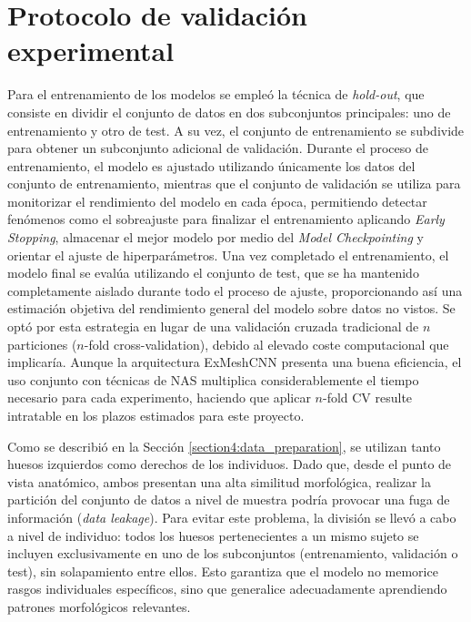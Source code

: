 \section{Protocolo de validación experimental}
Para el entrenamiento de los modelos se empleó la técnica de \textit{hold-out}, que consiste en dividir el conjunto de datos en dos subconjuntos principales: uno de entrenamiento y otro de test. A su vez, el conjunto de entrenamiento se subdivide para obtener un subconjunto adicional de validación. Durante el proceso de entrenamiento, el modelo es ajustado utilizando únicamente los datos del conjunto de entrenamiento, mientras que el conjunto de validación se utiliza para monitorizar el rendimiento del modelo en cada época, permitiendo detectar fenómenos como el sobreajuste para finalizar el entrenamiento aplicando \textit{Early Stopping}, almacenar el mejor modelo por medio del \textit{Model Checkpointing} y orientar el ajuste de hiperparámetros. Una vez completado el entrenamiento, el modelo final se evalúa utilizando el conjunto de test, que se ha mantenido completamente aislado durante todo el proceso de ajuste, proporcionando así una estimación objetiva del rendimiento general del modelo sobre datos no vistos. Se optó por esta estrategia en lugar de una validación cruzada tradicional de $n$ particiones ($n$-fold cross-validation), debido al elevado coste computacional que implicaría. Aunque la arquitectura ExMeshCNN presenta una buena eficiencia, el uso conjunto con técnicas de NAS multiplica considerablemente el tiempo necesario para cada experimento, haciendo que aplicar $n$-fold CV resulte intratable en los plazos estimados para este proyecto.

Como se describió en la Sección \ref{section4:data_preparation}, se utilizan tanto huesos izquierdos como derechos de los individuos. Dado que, desde el punto de vista anatómico, ambos presentan una alta similitud morfológica, realizar la partición del conjunto de datos a nivel de muestra podría provocar una fuga de información (\textit{data leakage}). Para evitar este problema, la división se llevó a cabo a nivel de individuo: todos los huesos pertenecientes a un mismo sujeto se incluyen exclusivamente en uno de los subconjuntos (entrenamiento, validación o test), sin solapamiento entre ellos. Esto garantiza que el modelo no memorice rasgos individuales específicos, sino que generalice adecuadamente aprendiendo patrones morfológicos relevantes.

